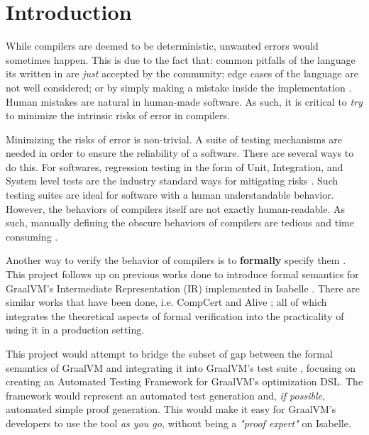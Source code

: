 \section{Introduction}

While compilers are deemed to be deterministic, unwanted errors would sometimes happen. This is due to the fact that: common pitfalls of the 
language its written in are \emph{just} accepted by the community; edge cases of the language are not well considered; or by simply making a 
mistake inside the implementation \cite[Sec. 1.2]{CompilerOptimization}. Human mistakes are natural in human-made software. As such, it is 
critical to \emph{try} to minimize the intrinsic risks of error in compilers.

Minimizing the risks of error is non-trivial. A suite of testing mechanisms are needed in order to ensure the reliability of a software. 
There are several ways to do this. For softwares, regression testing in the form of Unit, Integration, and System level tests are the 
industry standard ways for mitigating risks \cite{testing}. Such testing suites are ideal for software with a human understandable behavior. However, 
the behaviors of compilers itself are not exactly human-readable. As such, manually defining the obscure behaviors of compilers are tedious and 
time consuming \cite{compcertVerification}.

Another way to verify the behavior of compilers is to \textbf{formally} specify them \cite{compcertVerification}. This project follows up on 
previous works done to introduce formal semantics for GraalVM's \cite{graal} Intermediate Representation (IR)
\cite{ATVA21_GraalVM_IR_Semantics, Term_Graph_Optimizations} implemented in Isabelle \cite{IsabelleHOL}. There are similar works that have been 
done, i.e. CompCert \cite{compcertVerification} and Alive \cite{AliveInLean,Alive2}; all of which integrates the theoretical aspects of formal 
verification into the practicality of using it in a production setting.

This project would attempt to bridge the subset of gap between the formal semantics of GraalVM and integrating it into GraalVM's test suite 
\cite{Term_Graph_Optimizations}, focusing on creating an Automated Testing Framework for GraalVM's optimization DSL. The framework would represent an 
automated test generation and, \emph{if possible}, automated simple proof generation. This would make it easy for GraalVM's developers to use 
the tool \emph{as you go}, without being a \emph{"proof expert"} on Isabelle.

